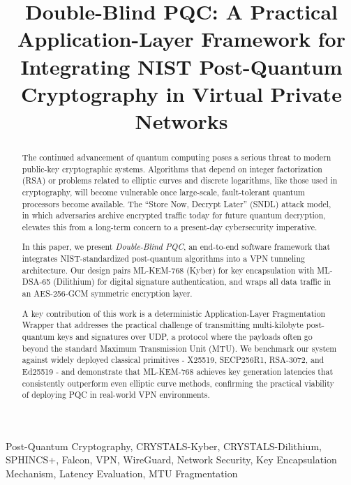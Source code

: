 \documentclass[10pt, conference, letterpaper]{IEEEtran}
\begin{document}
\title{Double-Blind PQC: A Practical Application-Layer Framework for Integrating NIST Post-Quantum Cryptography in Virtual Private Networks\\
}

\author{
}

\maketitle

\begin{abstract}
The continued advancement of quantum computing poses a serious threat to modern public-key cryptographic systems. Algorithms that depend on integer factorization (RSA) or problems related to elliptic curves and discrete logarithms, like those used in cryptography, will become vulnerable once large-scale, fault-tolerant quantum processors become available. The ``Store Now, Decrypt Later'' (SNDL) attack model, in which adversaries archive encrypted traffic today for future quantum decryption, elevates this from a long-term concern to a present-day cybersecurity imperative.

In this paper, we present \textit{Double-Blind PQC}, an end-to-end software framework that integrates NIST-standardized post-quantum algorithms into a VPN tunneling architecture. Our design pairs ML-KEM-768 (Kyber) for key encapsulation with ML-DSA-65 (Dilithium) for digital signature authentication, and wraps all data traffic in an AES-256-GCM symmetric encryption layer.

A key contribution of this work is a deterministic Application-Layer Fragmentation Wrapper that addresses the practical challenge of transmitting multi-kilobyte post-quantum keys and signatures over UDP, a protocol where the payloads often go beyond the standard Maximum Transmission Unit (MTU). We benchmark our system against widely deployed classical primitives - X25519, SECP256R1, RSA-3072, and Ed25519 - and demonstrate that ML-KEM-768 achieves key generation latencies that consistently outperform even elliptic curve methods, confirming the practical viability of deploying PQC in real-world VPN environments.
\end{abstract}

\begin{IEEEkeywords}
Post-Quantum Cryptography, CRYSTALS-Kyber, CRYSTALS-Dilithium, SPHINCS+, Falcon, VPN, WireGuard, Network Security, Key Encapsulation Mechanism, Latency Evaluation, MTU Fragmentation
\end{IEEEkeywords}
\end{document}
